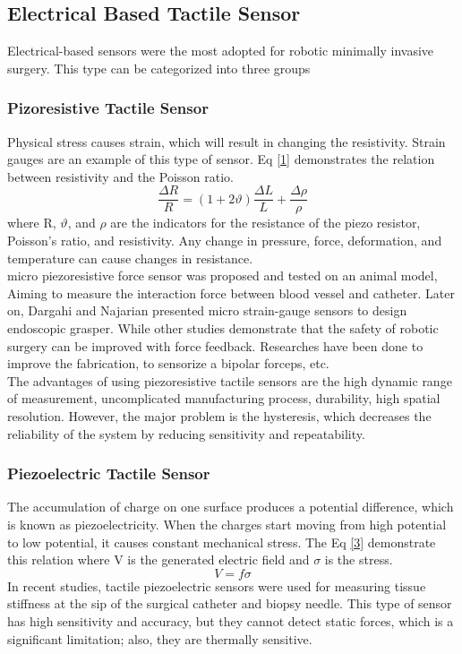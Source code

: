 \documentclass[conference]{IEEEtran}
\begin{document}
\subsection{Electrical Based Tactile Sensor}
Electrical-based sensors were the most adopted for robotic minimally invasive surgery. This type can be categorized into three groups 
\subsubsection{Pizoresistive Tactile Sensor}
Physical stress causes strain, which will result in changing the resistivity. Strain gauges are an example of this type of sensor. Eq \ref{1}  demonstrates the relation between resistivity and the Poisson ratio. 
\begin{equation}
	\frac{\Delta R}{R}=(1+2\vartheta)\frac{\Delta L}{L}+\frac{\Delta \rho }{\rho }
	\label{1}
\end{equation}
where R, $\vartheta$, and $\rho$ are the indicators for the resistance of the piezo resistor, Poisson's ratio, and resistivity. Any change in pressure, force, deformation, and temperature can cause changes in resistance.\\
micro piezoresistive force sensor was proposed and tested on an animal model, Aiming to measure the interaction force between blood vessel and catheter. Later on, Dargahi and Najarian presented micro strain-gauge sensors to design endoscopic grasper. While other studies demonstrate that the safety of robotic surgery can be improved with force feedback. Researches have been done to improve the fabrication, to sensorize a bipolar forceps, etc.\\The advantages of using piezoresistive tactile sensors are the high dynamic range of measurement, uncomplicated manufacturing process, durability, high spatial resolution. However, the major problem is the hysteresis, which decreases the reliability of the system by reducing sensitivity and repeatability. 

\subsubsection{Piezoelectric Tactile Sensor}
The accumulation of charge on one surface produces a potential difference, which is known as piezoelectricity. When the charges start moving from high potential to low potential, it causes constant mechanical stress. The Eq \ref{3} demonstrate this relation where V is the generated electric field and $\sigma$ is the stress.
\begin{equation}
	V= f\sigma
	\label{3}
\end{equation}
In recent studies, tactile piezoelectric sensors were used for measuring tissue stiffness at the sip of the surgical catheter and biopsy needle. This type of sensor has high sensitivity and accuracy, but they cannot detect static forces, which is a significant limitation; also, they are thermally sensitive.
\end{document}
